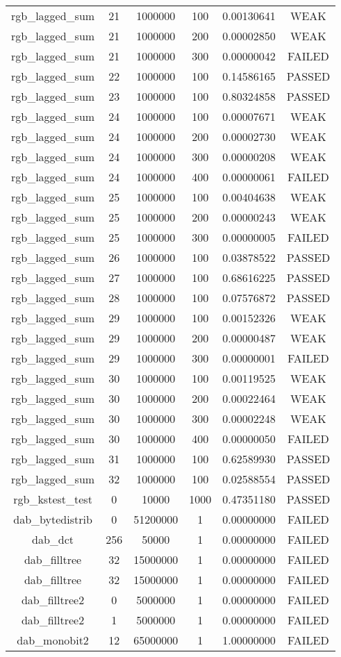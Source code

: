 \begin{longtable}{cccccc}
rgb\_lagged\_sum & 21 & 1000000 & 100 & 0.00130641 & WEAK \\
rgb\_lagged\_sum & 21 & 1000000 & 200 & 0.00002850 & WEAK \\
rgb\_lagged\_sum & 21 & 1000000 & 300 & 0.00000042 & FAILED \\
rgb\_lagged\_sum & 22 & 1000000 & 100 & 0.14586165 & PASSED \\
rgb\_lagged\_sum & 23 & 1000000 & 100 & 0.80324858 & PASSED \\
rgb\_lagged\_sum & 24 & 1000000 & 100 & 0.00007671 & WEAK \\
rgb\_lagged\_sum & 24 & 1000000 & 200 & 0.00002730 & WEAK \\
rgb\_lagged\_sum & 24 & 1000000 & 300 & 0.00000208 & WEAK \\
rgb\_lagged\_sum & 24 & 1000000 & 400 & 0.00000061 & FAILED \\
rgb\_lagged\_sum & 25 & 1000000 & 100 & 0.00404638 & WEAK \\
rgb\_lagged\_sum & 25 & 1000000 & 200 & 0.00000243 & WEAK \\
rgb\_lagged\_sum & 25 & 1000000 & 300 & 0.00000005 & FAILED \\
rgb\_lagged\_sum & 26 & 1000000 & 100 & 0.03878522 & PASSED \\
rgb\_lagged\_sum & 27 & 1000000 & 100 & 0.68616225 & PASSED \\
rgb\_lagged\_sum & 28 & 1000000 & 100 & 0.07576872 & PASSED \\
rgb\_lagged\_sum & 29 & 1000000 & 100 & 0.00152326 & WEAK \\
rgb\_lagged\_sum & 29 & 1000000 & 200 & 0.00000487 & WEAK \\
rgb\_lagged\_sum & 29 & 1000000 & 300 & 0.00000001 & FAILED \\
rgb\_lagged\_sum & 30 & 1000000 & 100 & 0.00119525 & WEAK \\
rgb\_lagged\_sum & 30 & 1000000 & 200 & 0.00022464 & WEAK \\
rgb\_lagged\_sum & 30 & 1000000 & 300 & 0.00002248 & WEAK \\
rgb\_lagged\_sum & 30 & 1000000 & 400 & 0.00000050 & FAILED \\
rgb\_lagged\_sum & 31 & 1000000 & 100 & 0.62589930 & PASSED \\
rgb\_lagged\_sum & 32 & 1000000 & 100 & 0.02588554 & PASSED \\
rgb\_kstest\_test & 0 & 10000 & 1000 & 0.47351180 & PASSED \\
dab\_bytedistrib & 0 & 51200000 & 1 & 0.00000000 & FAILED \\
dab\_dct & 256 & 50000 & 1 & 0.00000000 & FAILED \\
dab\_filltree & 32 & 15000000 & 1 & 0.00000000 & FAILED \\
dab\_filltree & 32 & 15000000 & 1 & 0.00000000 & FAILED \\
dab\_filltree2 & 0 & 5000000 & 1 & 0.00000000 & FAILED \\
dab\_filltree2 & 1 & 5000000 & 1 & 0.00000000 & FAILED \\
dab\_monobit2 & 12 & 65000000 & 1 & 1.00000000 & FAILED \\
\bottomrule
\end{longtable}

